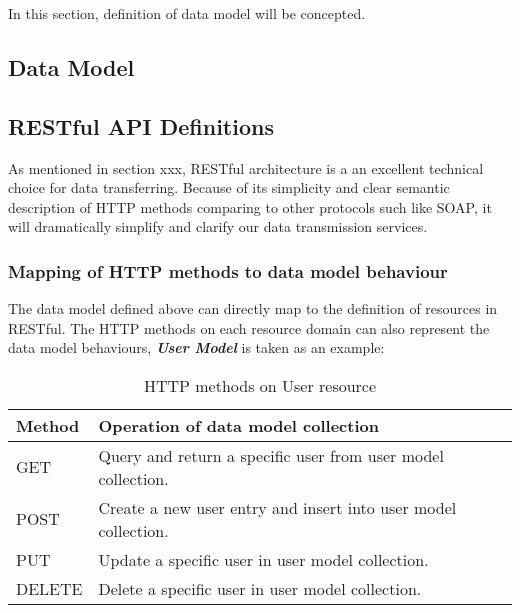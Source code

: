 

In this section, definition of data model will be concepted. 


\subsection{Data Model}





\subsection{RESTful API Definitions}

As mentioned in section xxx, RESTful architecture is a an excellent technical choice for data transferring. Because of its simplicity and clear semantic description of HTTP methods comparing to other protocols such like SOAP, it will dramatically simplify and clarify our data transmission services. 

\subsubsection{ Mapping of HTTP methods to data model behaviour }
The data model defined above can directly map to the definition of resources in RESTful. The HTTP methods on each resource domain can also represent the data model behaviours, \textbf{\textit{User Model}} is taken as an example: 
\begin{table}[!htbp]
\centering
\begin{tabular}{@{}lllll@{}}
\toprule
Method        & \multicolumn{4}{l}{Operation of data model collection }                            \\ \midrule
GET           & \multicolumn{4}{l}{Query and return a specific user from user model collection.}   \\
POST          & \multicolumn{4}{l}{Create a new user entry and insert into user model collection.} \\
PUT           & \multicolumn{4}{l}{Update a specific user in user model collection.}               \\
DELETE        & \multicolumn{4}{l}{Delete a specific user in user model collection.}               \\ \bottomrule
\end{tabular}
\caption{HTTP methods on User resource}
\label{http-method-on-user-resource}
\end{table}


